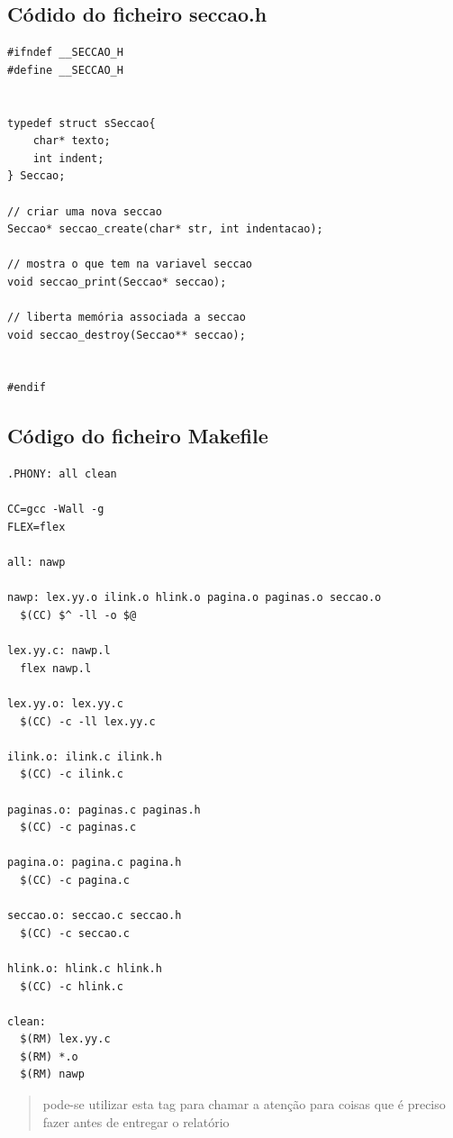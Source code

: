 \documentclass[11pt, a4paper, oneside]{article}
\newcommand{\todo}[1] {\textcolor{BrickRed}{\begin{quote}#1\end{quote}}}
\begin{document}
\newpage
\subsection{Códido do ficheiro seccao.h}
\begin{verbatim}
#ifndef __SECCAO_H
#define __SECCAO_H


typedef struct sSeccao{
    char* texto;
    int indent;
} Seccao;

// criar uma nova seccao
Seccao* seccao_create(char* str, int indentacao);

// mostra o que tem na variavel seccao
void seccao_print(Seccao* seccao);

// liberta memória associada a seccao
void seccao_destroy(Seccao** seccao);


#endif
\end{verbatim}
\newpage

\subsection{Código do ficheiro Makefile}

\begin{verbatim}
.PHONY: all clean

CC=gcc -Wall -g
FLEX=flex

all: nawp

nawp: lex.yy.o ilink.o hlink.o pagina.o paginas.o seccao.o
  $(CC) $^ -ll -o $@

lex.yy.c: nawp.l
  flex nawp.l

lex.yy.o: lex.yy.c 
  $(CC) -c -ll lex.yy.c

ilink.o: ilink.c ilink.h
  $(CC) -c ilink.c

paginas.o: paginas.c paginas.h
  $(CC) -c paginas.c

pagina.o: pagina.c pagina.h
  $(CC) -c pagina.c

seccao.o: seccao.c seccao.h
  $(CC) -c seccao.c

hlink.o: hlink.c hlink.h
  $(CC) -c hlink.c

clean:
  $(RM) lex.yy.c
  $(RM) *.o
  $(RM) nawp

\end{verbatim}
\newpage
\todo{pode-se utilizar esta tag para chamar a atenção para coisas que é preciso fazer antes de entregar o relatório}

\newpage
\end{document}
